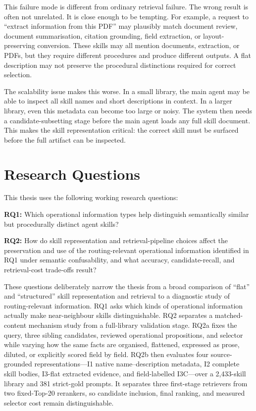 This failure mode is different from ordinary retrieval failure. The wrong result is often not unrelated. It is close enough to be tempting. For example, a request to ``extract information from this PDF'' may plausibly match document review, document summarisation, citation grounding, field extraction, or layout-preserving conversion. These skills may all mention documents, extraction, or PDFs, but they require different procedures and produce different outputs. A flat description may not preserve the procedural distinctions required for correct selection.

The scalability issue makes this worse. In a small library, the main agent may be able to inspect all skill names and short descriptions in context. In a larger library, even this metadata can become too large or noisy. The system then needs a candidate-subsetting stage before the main agent loads any full skill document. This makes the skill representation critical: the correct skill must be surfaced before the full artifact can be inspected.

\section{Research Questions}

This thesis uses the following working research questions:

\textbf{RQ1:} Which operational information types help distinguish semantically similar but procedurally distinct agent skills?

\textbf{RQ2:} How do skill representation and retrieval-pipeline choices affect the preservation and use of the routing-relevant operational information identified in RQ1 under semantic confusability, and what accuracy, candidate-recall, and retrieval-cost trade-offs result?

These questions deliberately narrow the thesis from a broad comparison of ``flat'' and ``structured'' skill representation and retrieval to a diagnostic study of routing-relevant information. RQ1 asks which kinds of operational information actually make near-neighbour skills distinguishable. RQ2 separates a matched-content mechanism study from a full-library validation stage. RQ2a fixes the query, three sibling candidates, reviewed operational propositions, and selector while varying how the same facts are organised, flattened, expressed as prose, diluted, or explicitly scored field by field. RQ2b then evaluates four source-grounded representations---I1 native name--description metadata, I2 complete skill bodies, I3-flat extracted evidence, and field-labelled I3C---over a 2,433-skill library and 381 strict-gold prompts. It separates three first-stage retrievers from two fixed-Top-20 rerankers, so candidate inclusion, final ranking, and measured selector cost remain distinguishable.

